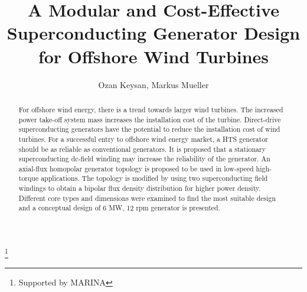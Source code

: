 \documentclass[12pt]{iopart}
\begin{document}
\title[]{A Modular and Cost-Effective Superconducting Generator Design for Offshore Wind Turbines}
\footnote{Supported by MARINA}
\author{Ozan Keysan, Markus Mueller}

\address{Institute for Energy Systems,
University of Edinburgh, 
EH93JL, UK}

\begin{abstract}
For offshore wind energy, there is a trend  towards larger wind turbines. The increased power take-off system mass increases the installation cost of the turbine. Direct-drive superconducting generators have the potential to reduce the installation cost of wind turbines. For a successful entry to offshore wind energy market, a HTS generator should be as reliable as conventional generators. It is proposed that a stationary superconducting dc-field winding may increase the reliability of the generator. An axial-flux homopolar generator topology is proposed to be used in low-speed high-torque applications. The topology is modified by using two superconducting field windings to obtain a bipolar flux density distribution for higher power density. Different core types and dimensions were examined to find the most suitable design and a conceptual design of 6 MW, 12 rpm generator is presented.


\end{abstract}
\end{document}
